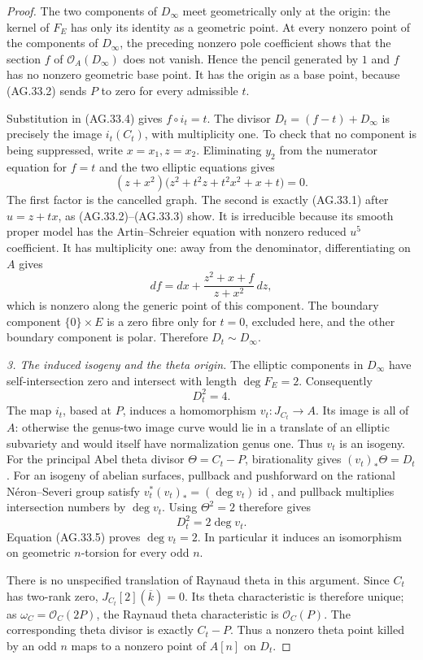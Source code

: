 \begin{proof}
The two components of $D_\infty$ meet geometrically only
at the origin: the kernel of $F_E$ has only its
identity as a geometric point. At every nonzero point of
the components of $D_\infty$, the preceding nonzero pole
coefficient shows that the section $f$ of
$\mathcal O_A(D_\infty)$ does not vanish. Hence the pencil
generated by $1$ and $f$ has no nonzero geometric base point.
It has the origin as a base point, because (AG.33.2) sends
$P$ to zero for every admissible $t$.

Substitution in (AG.33.4) gives $f\circ i_t=t$.
The divisor $D_t=(f-t)+D_\infty$ is precisely the image
$i_t(C_t)$, with multiplicity one. To check that no
component is being suppressed, write $x=x_1,z=x_2$.
Eliminating $y_2$ from the numerator equation for $f=t$
and the two elliptic equations gives
\[
 (z+x^2)\bigl(z^2+t^2z+t^2x^2+x+t\bigr)=0.
\]
The first factor is the cancelled graph. The second is
exactly (AG.33.1) after $u=z+tx$, as (AG.33.2)--(AG.33.3)
show. It is irreducible because its smooth proper model
has the Artin--Schreier equation with nonzero reduced
$u^5$ coefficient. It has multiplicity one: away from
the denominator, differentiating on $A$ gives
\[
                   df=dx+
                  \frac{z^2+x+f}{z+x^2}\,dz,
\]
which is nonzero along the generic point of this component.
The boundary component $\{0\}\times E$ is a zero fibre
only for $t=0$, excluded here, and the other boundary
component is polar. Therefore $D_t\sim D_\infty$.

\emph{3. The induced isogeny and the theta origin.}
The elliptic components in $D_\infty$ have self-intersection
zero and intersect with length $\deg F_E=2$. Consequently
\[
                         D_t^2=4.                     \tag{AG.33.5}
\]
The map $i_t$, based at $P$, induces a homomorphism
$v_t:J_{C_t}\to A$. Its image is all of $A$: otherwise
the genus-two image curve would lie in a translate of an
elliptic subvariety and would itself have normalization
genus one. Thus $v_t$ is an isogeny.
For the principal Abel theta divisor $\Theta=C_t-P$,
birationality gives $(v_t)_*\Theta=D_t$.
For an isogeny of abelian surfaces, pullback and pushforward
on the rational N\'eron--Severi group satisfy
$v_t^*(v_t)_*=(\deg v_t)\operatorname{id}$, and pullback
multiplies intersection numbers by $\deg v_t$.
Using $\Theta^2=2$ therefore gives
\[
                       D_t^2=2\deg v_t.
\]
Equation (AG.33.5) proves $\deg v_t=2$.
In particular it induces an isomorphism on geometric
$n$-torsion for every odd $n$.

There is no unspecified translation of Raynaud theta in
this argument. Since $C_t$ has two-rank zero,
$J_{C_t}[2](\overline k)=0$. Its theta characteristic is
therefore unique; as $\omega_C=\mathcal O_C(2P)$, the
Raynaud theta characteristic is $\mathcal O_C(P)$.
The corresponding theta divisor is exactly $C_t-P$.
Thus a nonzero theta point killed by an odd $n$ maps to
a nonzero point of $A[n]$ on $D_t$.


\end{proof}

